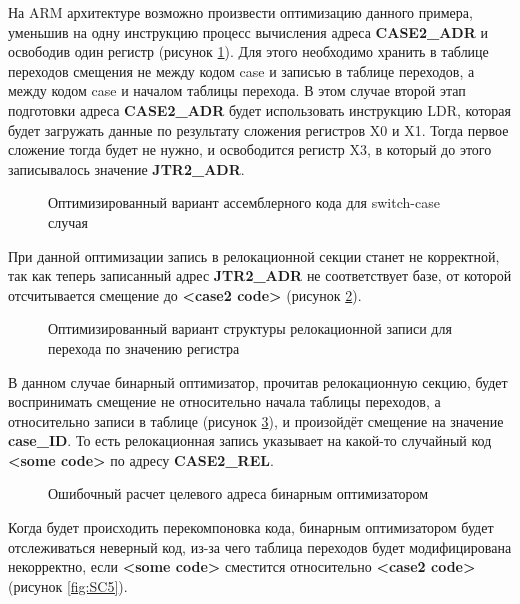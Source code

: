 На ARM архитектуре возможно произвести оптимизацию данного примера, уменьшив на одну инструкцию процесс вычисления адреса \textbf{CASE2\_ADR} и освободив один регистр (рисунок \cref{fig:SC3}). Для этого необходимо хранить в таблице переходов смещения не между кодом case и записью в таблице переходов, а между кодом case и началом таблицы перехода. В этом случае второй этап подготовки адреса \textbf{CASE2\_ADR} будет использовать инструкцию LDR, которая будет загружать данные по результату сложения регистров X0 и X1. Тогда первое сложение тогда будет не нужно, и освободится регистр X3, в который до этого записывалось значение \textbf{JTR2\_ADR}.

\begin{figure}[!h]
    \centerfloat{
        \texttt{[image: jt4]}
    }
    \caption{Оптимизированный вариант ассемблерного кода для switch-case случая}\label{fig:SC3}
\end{figure}

При данной оптимизации запись в релокационной секции станет не корректной, так как теперь записанный адрес \textbf{JTR2\_ADR} не соответствует базе, от которой отсчитывается  смещение до \textbf{<case2 code>} (рисунок \cref{fig:Rel2}).

\begin{figure}[!h]
    \centerfloat{
        \texttt{[image: jt\_2]}
    }
    \caption{Оптимизированный вариант структуры релокационной записи для перехода по значению регистра}\label{fig:Rel2}
\end{figure}

В данном случае бинарный оптимизатор, прочитав релокационную секцию, будет воспринимать смещение не относительно начала таблицы переходов, а относительно записи в таблице (рисунок \cref{fig:SC4}), и произойдёт смещение на значение \textbf{case\_ID}. То есть релокационная запись указывает на какой-то случайный код \textbf{<some code>} по адресу \textbf{CASE2\_REL}.

\begin{figure}[!h]
    \centerfloat{
        \texttt{[image: jt5]}
    }
    \caption{Ошибочный расчет целевого адреса бинарным оптимизатором}\label{fig:SC4}
\end{figure}

Когда будет происходить перекомпоновка кода, бинарным оптимизатором будет отслеживаться неверный код, из-за чего таблица переходов будет модифицирована некорректно, если \textbf{<some code>} сместится относительно \textbf{<case2 code>} (рисунок \cref{fig:SC5}).

